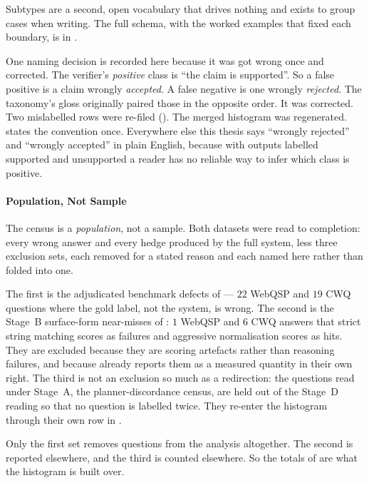 Subtypes are a second, open vocabulary that drives nothing and exists to group
cases when writing. The full schema, with the worked examples that fixed each
boundary, is  in .

One naming decision is recorded here because it was got wrong once and
corrected. The verifier's \emph{positive} class is ``the claim is supported''.
So a false positive is a claim wrongly \emph{accepted}. A false negative is one
wrongly \emph{rejected}. The taxonomy's gloss originally paired those in the
opposite order. It was corrected. Two mislabelled rows were re-filed
(). The merged histogram was
regenerated.  states the convention once. Everywhere else
this thesis says ``wrongly rejected'' and ``wrongly accepted'' in plain English,
because with outputs labelled \textsf{supported} and \textsf{unsupported} a
reader has no reliable way to infer which class is positive.

\paragraph{Population, Not Sample}

The census is a \emph{population}, not a sample. Both
datasets were read to completion: every wrong answer and every hedge produced by
the full system, less three exclusion sets, each removed for a stated reason and
each named here rather than folded into one.

The first is the adjudicated benchmark defects of  ---
$22$ WebQSP and $19$ CWQ questions where the gold label, not the system, is
wrong. The second is the Stage~B surface-form near-misses of :
$1$ WebQSP and $6$ CWQ answers that strict string matching scores as failures
and aggressive normalisation scores as hits. They are excluded because they are
scoring artefacts rather than reasoning failures, and because 
already reports them as a measured quantity in their own right. The third is not
an exclusion so much as a redirection: the questions read under Stage~A, the
planner-discordance census, are held out of the Stage~D reading so that no
question is labelled twice. They re-enter the histogram through their own
row in .

Only the first set removes questions from the analysis altogether. The second is
reported elsewhere, and the third is counted elsewhere. So the totals of
 are what the histogram is built over.

